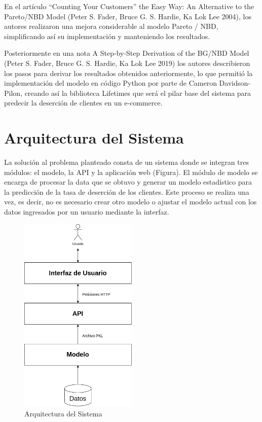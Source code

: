 	En el artículo “Counting Your Customers” the Easy Way: An Alternative to the Pareto/NBD Model (Peter S. Fader, Bruce G. S. Hardie, Ka Lok Lee 2004), los autores realizaron una mejora considerable al modelo Pareto / NBD, simplificando así su implementación y manteniendo los resultados.

	Posteriormente en una nota A Step-by-Step Derivation of the BG/NBD Model (Peter S. Fader, Bruce G. S. Hardie, Ka Lok Lee 2019) los autores describieron los pasos para derivar los resultados obtenidos anteriormente, lo que permitió la implementación del modelo en código Python por parte de Cameron Davidson-Pilon, creando así la biblioteca Lifetimes que será el pilar base del sistema para predecir la deserción de clientes en un e-commerce.

\section{Arquitectura del Sistema}

La solución al problema planteado consta de un sistema donde se integran tres módulos: el modelo, la API y la aplicación web (Figura). El módulo de modelo se encarga de procesar la data que se obtuvo y generar un modelo estadístico para la predicción de la tasa de deserción de los clientes. Este proceso se realiza una vez, es decir, no es necesario crear otro modelo o ajustar el modelo actual con los datos ingresados por un usuario mediante la interfaz.

\begin{figure}[H]
	\centering \includegraphics[width=0.50\textwidth]{images/arquitectura-proyecto-de-grado.png}
	\caption{Arquitectura del Sistema}
	\label{fig:arq}
\end{figure}

